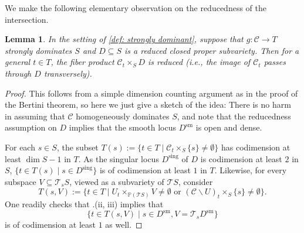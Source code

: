 \documentclass[11pt, letterpaper]{amsart}
\theoremstyle{plain}
\newtheorem{lemma}[theorem]{Lemma}
\theoremstyle{definition}
\newcommand{\IP}{\mathbb{P}}
\newcommand{\<}{\langle}
\renewcommand{\>}{\rangle}
\newcommand{\sT}{\mathcal{T}}
\newcommand{\shC}{\mathscr{C}}
\begin{document}
We make the following elementary observation on the reducedness of the intersection.
\begin{lemma}
    \label{lem: transverse intersection general}
    In the setting of \cref{def: strongly dominant}, suppose that $g : \shC \to T$ strongly dominates $S$ and $D \subseteq S$ is a reduced closed proper subvariety. 
    Then for a general $t \in T$, the fiber product $\shC_t \times_S D$ is reduced (i.e., the image of $\shC_t$ passes through $D$ transversely). 
\end{lemma}
\begin{proof}
    This follows from a simple dimension counting argument as in the proof of the Bertini theorem, so here we just give a sketch of the idea: There is no harm in assuming that $\shC$ homogeneously dominates $S$, and note that the reducedness assumption on $D$ implies that the smooth locus $D^{\mathrm{sm}}$ is open and dense. 
    
    For each $s \in S$, the subset $ T(s) := \{ t \in T \mid \shC_t \times_S \{ s \} \neq \emptyset \}$ has codimension at least $\dim S - 1$ in $T$. 
    As the singular locus $D^{\mathrm{sing}}$ of $D$ is codimension at least $2$ in $S$, $\{ t \in T(s) \mid s \in D^{\mathrm{sing}} \} $ is of codimension at least $1$ in $T$. 
    Likewise, for every subspace $V \subseteq \sT_s S$, viewed as a subvariety of $\sT S$, consider 
    $$ T(s, V) := \{ t \in T \mid U_t \times_{\IP(\sT S)} V \neq \emptyset \textrm{ or } (\shC \smallsetminus U)_t \times_S \{ s \} \neq \emptyset \}.  $$
    One readily checks that .(ii, iii) implies that 
    $$ \{ t \in T(s, V) \mid s \in D^{\mathrm{sm}}, V = \sT_s D^{\mathrm{sm}} \} $$
    is of codimension at least $1$ as well. 
\end{proof}
\end{document}
